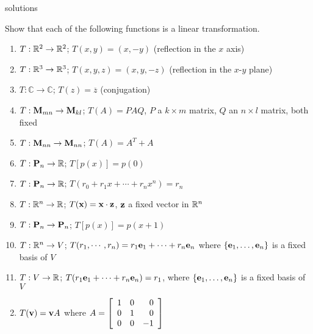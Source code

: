 \begin{Filesave}{solutions}
\end{Filesave}

\begin{multicols}{2}
\begin{ex}
Show that each of the following functions is a linear transformation.


\begin{enumerate}[label={\alph*.}]
\item $T : \mathbb{R}^2 \to \mathbb{R}^2$; $T(x, y) = (x, -y)$ (reflection in the $x$ axis)

\item $T : \mathbb{R}^3 \to \mathbb{R}^3$; $T(x, y, z) = (x, y, -z)$ (reflection in the $x$-$y$ plane)

\item $T : \mathbb{C} \to \mathbb{C}$; $T(z) = \overline{z}$ (conjugation)

\item $T : \textbf{M}_{mn} \to \textbf{M}_{kl}$; $T(A) = PAQ$, $P$ a $k \times m$ matrix, $Q$ an $n \times l$ matrix, both fixed

\item $T : \textbf{M}_{nn} \to \textbf{M}_{nn}$; $T(A) = A^{T} + A$

\item $T : \textbf{P}_{n} \to \mathbb{R}$; $T\left[p(x)\right] = p(0)$

\item $T : \textbf{P}_{n} \to \mathbb{R}$; $T(r_{0} + r_{1}x + \cdots  + r_{n}x^{n}) = r_{n}$

\item $T : \mathbb{R}^n \to \mathbb{R}$; $T(\textbf{x}) = \textbf{x} \cdot \textbf{z}$, $\textbf{z}$ a fixed vector in $\mathbb{R}^n$

\item $T : \textbf{P}_{n} \to \textbf{P}_{n}$; $T\left[p(x)\right] = p(x + 1)$

\item $T : \mathbb{R}^n \to V$; $T(r_{1}, \cdots, r_{n}) = r_{1}\textbf{e}_{1} + \cdots + r_{n}\textbf{e}_{n}$ where $\{\textbf{e}_{1}, \dots, \textbf{e}_{n}\}$ is a fixed basis of $V$

\item $T : V \to \mathbb{R}$; $T(r_{1}\textbf{e}_{1} + \cdots + r_{n}\textbf{e}_{n}) = r_{1}$, where $\{\textbf{e}_{1}, \dots, \textbf{e}_{n}\}$ is a fixed basis of $V$
\end{enumerate}
\begin{sol}
\begin{enumerate}[label={\alph*.}]
\setcounter{enumi}{1} 
\item $T(\textbf{v}) = \textbf{v}A$ where $A = \left[ \begin{array}{rrr}
1 & 0 & 0 \\
0 & 1 & 0 \\
0 & 0 & -1
\end{array} \right]$


\end{enumerate}
\end{sol}
\end{ex}
\end{multicols}
